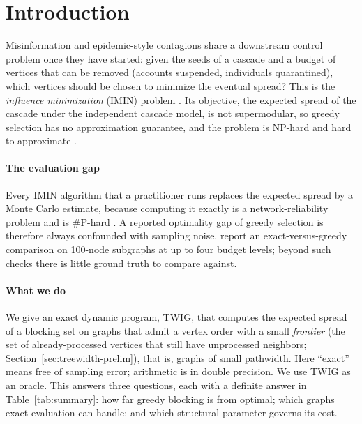 \documentclass[preprint,11pt]{elsarticle}
\theoremstyle{definition}
\theoremstyle{remark}
\begin{document}
\section{Introduction}\label{sec:intro}

Misinformation and epidemic-style contagions share a downstream control problem once they have started: given the seeds of a cascade and a budget of vertices that can be removed (accounts suspended, individuals quarantined), which vertices should be chosen to minimize the eventual spread? This is the \emph{influence minimization} (IMIN) problem \citep{xie2023,xie2024}. Its objective, the expected spread of the cascade under the independent cascade model, is not supermodular, so greedy selection has no approximation guarantee, and the problem is NP-hard and hard to approximate \citep{xie2023}.

\paragraph{The evaluation gap} Every IMIN algorithm that a practitioner runs replaces the expected spread by a Monte Carlo estimate, because computing it exactly is a network-reliability problem and is \#P-hard \citep{valiant1979,provan1983}. A reported optimality gap of greedy selection is therefore always confounded with sampling noise. \citet{xie2024} report an exact-versus-greedy comparison on 100-node subgraphs at up to four budget levels; beyond such checks there is little ground truth to compare against.

\paragraph{What we do} We give an exact dynamic program, TWIG, that computes the expected spread of a blocking set on graphs that admit a vertex order with a small \emph{frontier} (the set of already-processed vertices that still have unprocessed neighbors; Section~\ref{sec:treewidth-prelim}), that is, graphs of small pathwidth. Here ``exact'' means free of sampling error; arithmetic is in double precision. We use TWIG as an oracle. This answers three questions, each with a definite answer in Table~\ref{tab:summary}: how far greedy blocking is from optimal; which graphs exact evaluation can handle; and which structural parameter governs its cost.
\end{document}
